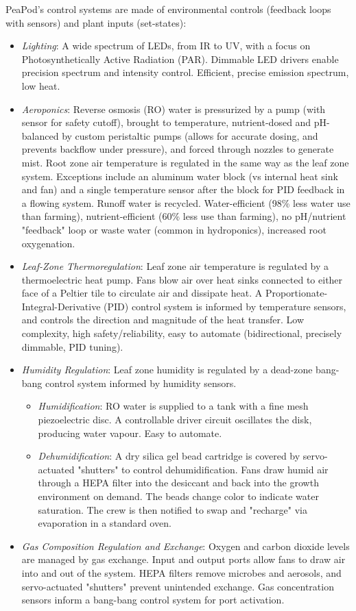 PeaPod's control systems are made of environmental controls (feedback loops with sensors) and plant inputs (set-states):
\begin{itemize}
    \item\textit{Lighting}: A wide spectrum of LEDs, from IR to UV, with a focus on Photosynthetically Active Radiation (PAR). Dimmable LED drivers enable precision spectrum and intensity control. Efficient, precise emission spectrum, low heat.
    \item \textit{Aeroponics}: Reverse osmosis (RO) water is pressurized by a pump (with sensor for safety cutoff), brought to temperature, nutrient-dosed and pH-balanced by custom peristaltic pumps (allows for accurate dosing, and prevents backflow under pressure), and forced through nozzles to generate mist. Root zone air temperature is regulated in the same way as the leaf zone system. Exceptions include an aluminum water block (vs internal heat sink and fan) and a single temperature sensor after the block for PID feedback in a flowing system. Runoff water is recycled. Water-efficient (98\% less water use than farming), nutrient-efficient (60\% less use than farming), no pH/nutrient "feedback" loop or waste water (common in hydroponics), increased root oxygenation.
    \item \textit{Leaf-Zone Thermoregulation}: Leaf zone air temperature is regulated by a thermoelectric heat pump. Fans blow air over heat sinks connected to either face of a Peltier tile to circulate air and dissipate heat. A Proportionate-Integral-Derivative (PID) control system is informed by temperature sensors, and controls the direction and magnitude of the heat transfer. Low complexity, high safety/reliability, easy to automate (bidirectional, precisely dimmable, PID tuning).
    \item \textit{Humidity Regulation}: Leaf zone humidity is regulated by a dead-zone bang-bang control system informed by humidity sensors.
    \begin{itemize}
        \item \textit{Humidification}: RO water is supplied to a tank with a fine mesh piezoelectric disc. A controllable driver circuit oscillates the disk, producing water vapour. Easy to automate.
        \item \textit{Dehumidification}: A dry silica gel bead cartridge is covered by servo-actuated "shutters" to control dehumidification. Fans draw humid air through a HEPA filter into the desiccant and back into the growth environment on demand. The beads change color to indicate water saturation. The crew is then notified to swap and "recharge" via evaporation in a standard oven.
    \end{itemize}
    \item \textit{Gas Composition Regulation and Exchange}: Oxygen and carbon dioxide levels are managed by gas exchange. Input and output ports allow fans to draw air into and out of the system. HEPA filters remove microbes and aerosols, and servo-actuated "shutters" prevent unintended exchange. Gas concentration sensors inform a bang-bang control system for port activation.
\end{itemize}

